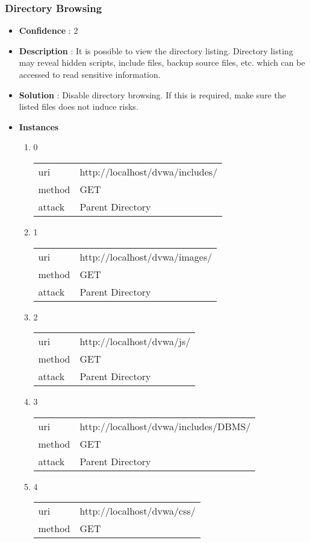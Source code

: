 \documentclass[10pt]{article}
\begin{document}
\subsubsection{Directory Browsing}
\begin{itemize}
\item[] \textbf{Confidence} : 2
\item[] \textbf{Description} : It is possible to view the directory listing.  Directory listing may reveal hidden scripts, include files, backup source files, etc. which can be accessed to read sensitive information.
\item[] \textbf{Solution} :  Disable directory browsing.  If this is required, make sure the listed files does not induce risks.
\item[] \textbf{Instances}
\begin{enumerate}
\item[] 0
\begin{tabular}{| l | p{12cm}}
uri & http://localhost/dvwa/includes/ \\
method & GET \\
attack & Parent Directory \\
\end{tabular}
\item[] 1
\begin{tabular}{| l | p{12cm}}
uri & http://localhost/dvwa/images/ \\
method & GET \\
attack & Parent Directory \\
\end{tabular}
\item[] 2
\begin{tabular}{| l | p{12cm}}
uri & http://localhost/dvwa/js/ \\
method & GET \\
attack & Parent Directory \\
\end{tabular}
\item[] 3
\begin{tabular}{| l | p{12cm}}
uri & http://localhost/dvwa/includes/DBMS/ \\
method & GET \\
attack & Parent Directory \\
\end{tabular}
\item[] 4
\begin{tabular}{| l | p{12cm}}
uri & http://localhost/dvwa/css/ \\
method & GET \\

\end{tabular}
\end{enumerate}
\end{itemize}
\end{document}
